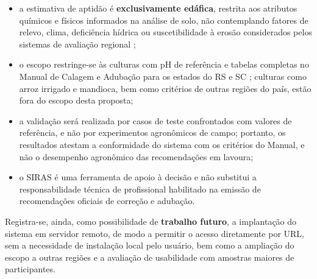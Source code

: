 \begin{itemize}

  \item a estimativa de aptidão é \textbf{exclusivamente edáfica},
    restrita aos atributos químicos e físicos informados na análise de
    solo, não contemplando fatores de relevo, clima, deficiência
    hídrica ou suscetibilidade à erosão considerados pelos sistemas de
    avaliação regional \citep{EmbrapaAptidao2025, Hofig2015};

  \item o escopo restringe-se às culturas com pH de referência e
    tabelas completas no Manual de Calagem e Adubação para os estados
    do RS e SC \citep{ManualCalagem2016}; culturas como arroz irrigado
    e mandioca, bem como critérios de outras regiões do país, estão
    fora do escopo desta proposta;

  \item a validação será realizada por casos de teste confrontados com
    valores de referência, e não por experimentos agronômicos de campo;
    portanto, os resultados atestam a conformidade do sistema com os
    critérios do Manual, e não o desempenho agronômico das
    recomendações em lavoura;

  \item o SIRAS é uma ferramenta de apoio à decisão e não substitui a
    responsabilidade técnica de profissional habilitado na emissão de
    recomendações oficiais de correção e adubação.

\end{itemize}

Registra-se, ainda, como possibilidade de \textbf{trabalho futuro}, a
implantação do sistema em servidor remoto, de modo a permitir o acesso
diretamente por URL, sem a necessidade de instalação local pelo usuário,
bem como a ampliação do escopo a outras regiões e a avaliação de
usabilidade com amostras maiores de participantes.
